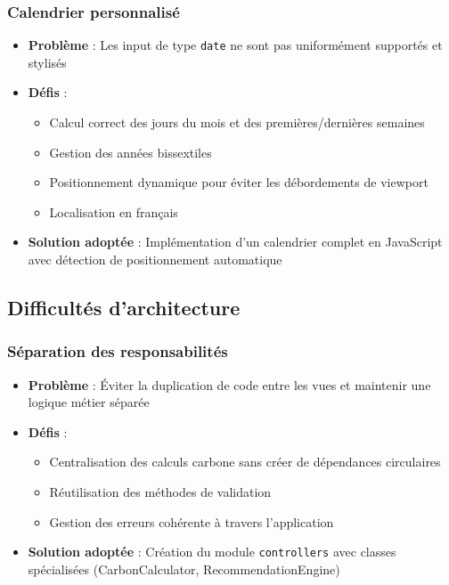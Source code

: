 \documentclass[a4paper,11pt]{article}
\begin{document}
            \subsubsection{Calendrier personnalisé}
                \begin{itemize}
                    \item \textbf{Problème} : Les input de type \texttt{date} ne sont pas uniformément supportés et stylisés
                    \item \textbf{Défis} :
                        \begin{itemize}
                            \item Calcul correct des jours du mois et des premières/dernières semaines
                            \item Gestion des années bissextiles
                            \item Positionnement dynamique pour éviter les débordements de viewport
                            \item Localisation en français
                        \end{itemize}
                    \item \textbf{Solution adoptée} : Implémentation d'un calendrier complet en JavaScript avec détection de positionnement automatique
                \end{itemize}

        \subsection{Difficultés d'architecture}

            \subsubsection{Séparation des responsabilités}
                \begin{itemize}
                    \item \textbf{Problème} : Éviter la duplication de code entre les vues et maintenir une logique métier séparée
                    \item \textbf{Défis} :
                        \begin{itemize}
                            \item Centralisation des calculs carbone sans créer de dépendances circulaires
                            \item Réutilisation des méthodes de validation
                            \item Gestion des erreurs cohérente à travers l'application
                        \end{itemize}
                    \item \textbf{Solution adoptée} : Création du module \texttt{controllers} avec classes spécialisées (CarbonCalculator, RecommendationEngine)
                \end{itemize}
\end{document}

